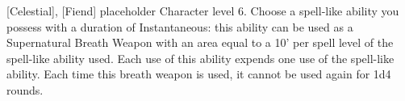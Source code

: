  {[Celestial], [Fiend]}
\shortdescfeat
{placeholder}
{Character level 6.}
{Choose a spell-like ability you possess with a duration of Instantaneous: this ability can be used as a Supernatural Breath Weapon with an area equal to a 10' per spell level of the spell-like ability used. Each use of this ability expends one use of the spell-like ability. Each time this breath weapon is used, it cannot be used again for 1d4 rounds.}